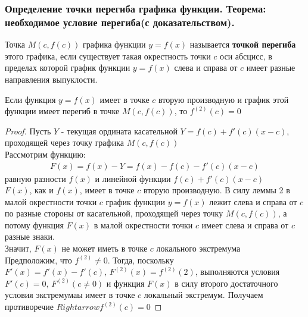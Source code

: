 \documentclass[10pt]{article}
\begin{document}
    \subsubsection{Определение точки перегиба графика функции. Теорема: необходимое условие перегиба(с доказательством).}
    \begin{definition}
        Точка $M(c, f(c))$ графика функции $y = f(x)$ называется \textbf{точкой перегиба} этого графика, если существует такая окрестность точки $c$ оси абсцисс, в пределах которой график функции $y = f(x)$ слева и справа от $c$ имеет разные направления выпуклости.
    \end{definition}
    \begin{theorem}
        Если функция $y = f(x)$ имеет в точке $c$ вторую производную и график этой функции имеет перегиб в точке $M(c, f(c))$, то $f^{(2)}(c) = 0$
    \end{theorem}
    \begin{proof}
        Пусть $Y$ - текущая ордината касательной $Y=f(c)+f'(c)(x-c)$, проходящей через точку графика $M(c, f(c))$\\
        Рассмотрим функцию:
        \begin{gather*}
            F(x)=f(x) - Y = f(x) - f(c) - f'(c)(x-c)
        \end{gather*}
        равную разности $f(x)$ и линейной функции $f(c)+f'(c)(x-c)$\\
        $F(x)$, как и $f(x)$, имеет в точке $c$ вторую производную. В силу леммы 2 в малой окрестности точки $c$ график функции $y = f(x)$ лежит слева и справа от $c$ по разные стороны от касательной, проходящей через точку $M(c, f(c))$, а потому функция $F(x)$ в малой окрестности точки $c$ имеет слева и справа от $c$ разные знаки.\\
        Значит, $F(x)$ не может иметь в точке $c$ локального экстремума\\
        Предположим, что $f^{(2)} \neq 0$. Тогда, поскольку $F'(x) = f'(x) - f'(c),\, F^{(2)}(x) = f^{(2)}(2)$, выполняются условия $F'(c) = 0,\,F^{(2)}(c \neq 0)$ и функция $F(x)$ в силу второго достаточного условия экстремумаы имеет в точке $c$ локальный экстремум. Получаем противоречие $Rightarrow f^{(2)}(c) = 0$ 
    \end{proof}
\end{document}
